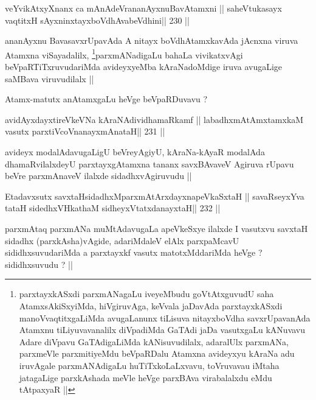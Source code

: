 \begin{shl}
veYvikAtxyXnanx ca mAnAdeVrananAyxnuBavAtamxni ||
saheVtukasayx vaqtitxH sAyxninxtayxboVdhAvabeVdhini\hfill || 230 ||
\end{shl}

\begin{artha}
ananAyxnu BavasavxrUpavAda A nitayx boVdhAtamxkavAda jAcnxna viruva
Atamxna viSayadalilx, \footnote[2]{parxtayxkASxdi parxmANagaLu
  iveyeMbudu goVtAtxguvudU saha AtamxsAkiSxyiMda, hiVgiruvAga, keVvala
jaDavAda parxtayxkASxdi manoVvaqtitxgaLiMda avugaLanunx tiLisuva
nitayxboVdha savxrUpavanAda Atamxnu tiLiyuvavanalilx diVpadiMda GaTAdi
jaDa vasutxgaLu kANuvavu Adare diVpavu GaTAdigaLiMda kANisuvudilalx,
adaralUlx parxmANa, parxmeVle parxmitiyeMdu beVpaRDalu Atamxna
avideyxyu kAraNa adu iruvAgale parxmANAdigaLu huTiTxkoLaLxvavu,
toVruvavau iMtaha jatagaLige parxkAshada meVle heVge parxBAva
virabalalxdu eMdu tAtpaxyaR ||}parxmANadigaLu bahaLa vivikatxvAgi
beVpaRTiTxruvudariMda avideyxyeMba kAraNadoMdige iruva avugaLige
saMBava viruvudilalx ||

Atamx-matutx anAtamxgaLu heVge beVpaRDuvavu ?
\end{artha}

\begin{shl}
avidAyxdayxtireVkeVNa kAraNAdividhamaRkamf ||
labadhxmAtAmxtamxkaM vasutx parxtiVcoV\s nanayxmAnataH\hfill || 231 ||
\end{shl}

\begin{artha}
avideyx modalAdavugaLigU beVreyAgiyU, kAraNa-kAyaR modalAda
dhamaRvilalxdeyU parxtayxgAtamxna tananx savxBAvaveV Agiruva rUpavu
beVre parxmAnaveV ilalxde sidadhxvAgiruvudu ||
\end{artha}

\begin{shl}
Etadavxsutx savxtaHsidadhxM\footnotemark[1] parxmAtArxdayxnapeVkaSxtaH ||
savaRseyxYva tataH sidedhxVH\footnotemark[1] kathaM sidheyxVtatxdanayxtaH\hfill || 232 ||
\end{shl}

\begin{artha}
parxmAtaq parxmANa muMtAdavugaLa apeVkeSxye ilalxde I vasutxvu savxtaH
sidadhx (parxkAsha)vAgide, adariMdaleV elAlx parxpaMcavU
sididhxsuvudariMda a parxtayxkf vasutx matotxMddariMda heVge ?
sididhxsuvudu ? ||
\end{artha}


